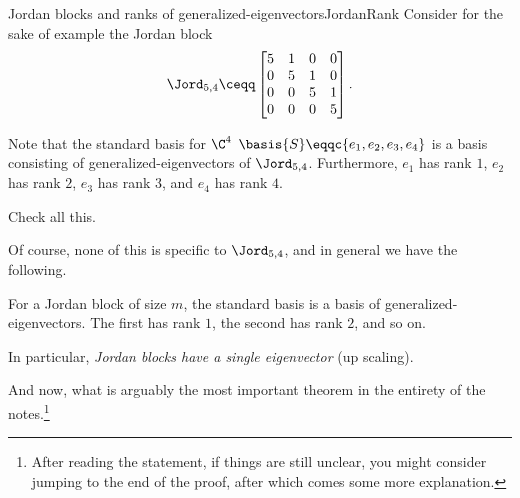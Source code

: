 \begin{exm}{Jordan blocks and ranks of generalized-eigenvectors}{JordanRank}
	Consider for the sake of example the Jordan block
	\begin{equation}
		\Jord _{5,4}\ceqq \begin{bmatrix}5 & 1 & 0 & 0 \\ 0 & 5 & 1 & 0 \\ 0 & 0 & 5 & 1 \\ 0 & 0 & 0 & 5\end{bmatrix}.
	\end{equation}
	
	Note that the standard basis for $\C ^4$ $\basis{S}\eqqc \{ e_1,e_2,e_3,e_4\}$ is a basis consisting of generalized-eigenvectors of $\Jord _{5,4}$.  Furthermore, $e_1$ has rank $1$, $e_2$ has rank $2$, $e_3$ has rank $3$, and $e_4$ has rank $4$.
	\begin{exr}[breakable=false]{}{}
		Check all this.
	\end{exr}

	Of course, none of this is specific to $\Jord _{5,4}$, and in general we have the following.
	\begin{important}
		For a Jordan block of size $m$, the standard basis is a basis of generalized-eigenvectors.  The first has rank $1$, the second has rank $2$, and so on.
		
		In particular, \emph{Jordan blocks have a single eigenvector} (up scaling).
	\end{important}
\end{exm}
And now, what is arguably the most important theorem in the entirety of the notes.\footnote{After reading the statement, if things are still unclear, you might consider jumping to the end of the proof, after which comes some more explanation.}
